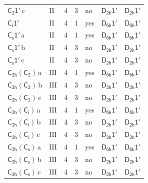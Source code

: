 \documentclass[10pt,a4paper]{article}
\numberwithin{equation}{section}
\newcommand{\grp}[1]{\mathsf{#1}}
\newcommand{\clsletter}[1]{\,{\scriptsize\color{black!55}#1}}
\begin{document}
{\begin{longtable}{@{}llrrlll@{}}
\href{C2-1p.pdf}{$\grp{C_{2}1'}$}\clsletter{c} & II & 4 & 3 & no & \href{D2h-1p.pdf}{$\grp{D_{2h}1'}$} & \href{D2h-1p.pdf}{$\grp{D_{2h}1'}$}\\
\href{S2-1p.pdf}{$\grp{C_{i}1'}$} & II & 4 & 1 & yes & \href{D6h-1p.pdf}{$\grp{D_{6h}1'}$} & \href{D6h-1p.pdf}{$\grp{D_{6h}1'}$}\\
\href{C1v-1p.pdf}{$\grp{C_{s}1'}$}\clsletter{a} & II & 4 & 1 & yes & \href{D6h-1p.pdf}{$\grp{D_{6h}1'}$} & \href{D6h-1p.pdf}{$\grp{D_{6h}1'}$}\\
\href{C1v-1p.pdf}{$\grp{C_{s}1'}$}\clsletter{b} & II & 4 & 3 & no & \href{D2h-1p.pdf}{$\grp{D_{2h}1'}$} & \href{D2h-1p.pdf}{$\grp{D_{2h}1'}$}\\
\href{C1v-1p.pdf}{$\grp{C_{s}1'}$}\clsletter{c} & II & 4 & 3 & no & \href{D2h-1p.pdf}{$\grp{D_{2h}1'}$} & \href{D2h-1p.pdf}{$\grp{D_{2h}1'}$}\\
\href{C2h-C2.pdf}{$\grp{C_{2h}}(\grp{C_{2}})$}\clsletter{a} & III & 4 & 1 & yes & \href{D6h-1p.pdf}{$\grp{D_{6h}1'}$} & \href{D6h-1p.pdf}{$\grp{D_{6h}1'}$}\\
\href{C2h-C2.pdf}{$\grp{C_{2h}}(\grp{C_{2}})$}\clsletter{b} & III & 4 & 3 & no & \href{D2h-1p.pdf}{$\grp{D_{2h}1'}$} & \href{D2h-1p.pdf}{$\grp{D_{2h}1'}$}\\
\href{C2h-C2.pdf}{$\grp{C_{2h}}(\grp{C_{2}})$}\clsletter{c} & III & 4 & 3 & no & \href{D2h-1p.pdf}{$\grp{D_{2h}1'}$} & \href{D2h-1p.pdf}{$\grp{D_{2h}1'}$}\\
\href{C2h-S2.pdf}{$\grp{C_{2h}}(\grp{C_{i}})$}\clsletter{a} & III & 4 & 1 & yes & \href{D6h-1p.pdf}{$\grp{D_{6h}1'}$} & \href{D6h-1p.pdf}{$\grp{D_{6h}1'}$}\\
\href{C2h-S2.pdf}{$\grp{C_{2h}}(\grp{C_{i}})$}\clsletter{b} & III & 4 & 3 & no & \href{D2h-1p.pdf}{$\grp{D_{2h}1'}$} & \href{D2h-1p.pdf}{$\grp{D_{2h}1'}$}\\
\href{C2h-S2.pdf}{$\grp{C_{2h}}(\grp{C_{i}})$}\clsletter{c} & III & 4 & 3 & no & \href{D2h-1p.pdf}{$\grp{D_{2h}1'}$} & \href{D2h-1p.pdf}{$\grp{D_{2h}1'}$}\\
\href{C2h-C1v.pdf}{$\grp{C_{2h}}(\grp{C_{s}})$}\clsletter{a} & III & 4 & 1 & yes & \href{D6h-1p.pdf}{$\grp{D_{6h}1'}$} & \href{D6h-1p.pdf}{$\grp{D_{6h}1'}$}\\
\href{C2h-C1v.pdf}{$\grp{C_{2h}}(\grp{C_{s}})$}\clsletter{b} & III & 4 & 3 & no & \href{D2h-1p.pdf}{$\grp{D_{2h}1'}$} & \href{D2h-1p.pdf}{$\grp{D_{2h}1'}$}\\
\href{C2h-C1v.pdf}{$\grp{C_{2h}}(\grp{C_{s}})$}\clsletter{c} & III & 4 & 3 & no & \href{D2h-1p.pdf}{$\grp{D_{2h}1'}$} & \href{D2h-1p.pdf}{$\grp{D_{2h}1'}$}\\

\end{longtable}}
\end{document}

